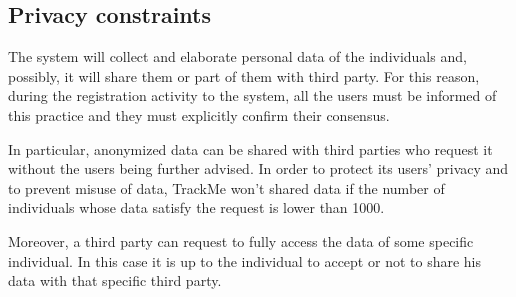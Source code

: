 \subsection{Privacy constraints}
The system will collect and elaborate personal data of the individuals and, possibly, it will share them or part of them with third party.  For this reason, during the registration activity to the system, all the users must be informed of this practice and they must explicitly confirm their consensus.

In particular, anonymized data can be shared with third parties who request it without the users being further advised. In order to protect its users' privacy and to prevent misuse of data, TrackMe won't shared data if the number of individuals whose data satisfy the request is lower than 1000.

Moreover, a third party can request to fully access the data of some specific individual. In this case it is up to the individual to accept or not to share his data with that specific third party.